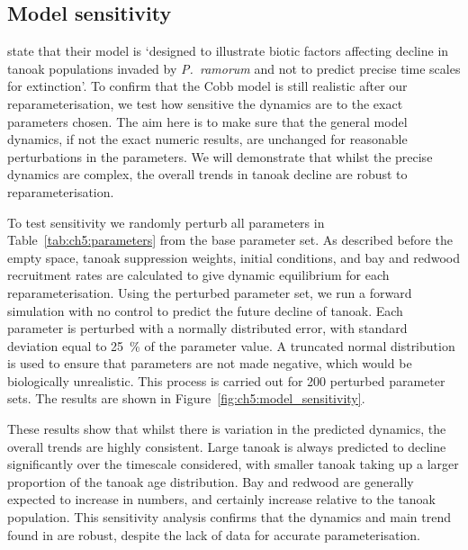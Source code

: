 \FloatBarrier
\subsection{Model sensitivity\label{sec:ch5:model_sensitivity}}

\citet{cobb_ecosystem_2012} state that their model is `designed to illustrate biotic factors affecting decline in tanoak populations invaded by \emph{P.~ramorum} and not to predict precise time scales for extinction'. To confirm that the Cobb model is still realistic after our reparameterisation, we test how sensitive the dynamics are to the exact parameters chosen. The aim here is to make sure that the general model dynamics, if not the exact numeric results, are unchanged for reasonable perturbations in the parameters. We will demonstrate that whilst the precise dynamics are complex, the overall trends in tanoak decline are robust to reparameterisation.

To test sensitivity we randomly perturb all parameters in Table~\ref{tab:ch5:parameters} from the base parameter set. As described before the empty space, tanoak suppression weights, initial conditions, and bay and redwood recruitment rates are calculated to give dynamic equilibrium for each reparameterisation. Using the perturbed parameter set, we run a forward simulation with no control to predict the future decline of tanoak. Each parameter is perturbed with a normally distributed error, with standard deviation equal to \SI{25}{\percent} of the parameter value. A truncated normal distribution is used to ensure that parameters are not made negative, which would be biologically unrealistic. This process is carried out for 200 perturbed parameter sets. The results are shown in Figure~\ref{fig:ch5:model_sensitivity}.

These results show that whilst there is variation in the predicted dynamics, the overall trends are highly consistent. Large tanoak is always predicted to decline significantly over the timescale considered, with smaller tanoak taking up a larger proportion of the tanoak age distribution. Bay and redwood are generally expected to increase in numbers, and certainly increase relative to the tanoak population. This sensitivity analysis confirms that the dynamics and main trend found in \citet{cobb_ecosystem_2012} are robust, despite the lack of data for accurate parameterisation.

